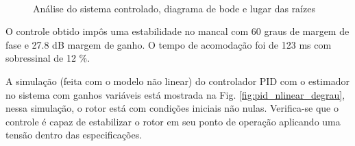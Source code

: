 \begin{figure}[!ht]
	\centering
		\\
		\caption{Análise do sistema controlado, diagrama de bode e lugar das raízes}
		\label{Fig:controle:analise}
\end{figure}

O controle obtido impôs uma estabilidade no mancal com 60 graus de margem de fase e 27.8 dB margem de ganho. O tempo de acomodação foi de 123 ms com sobressinal de 12 \%. 

A simulação (feita com o modelo não linear) do controlador PID  com o estimador no sistema com ganhos variáveis está mostrada na Fig. \ref{fig:pid_nlinear_degrau}, nessa simulação, o rotor está com condições iniciais não nulas. Verifica-se que o controle é capaz de estabilizar o rotor em seu ponto de operação aplicando uma tensão dentro das especificações.

